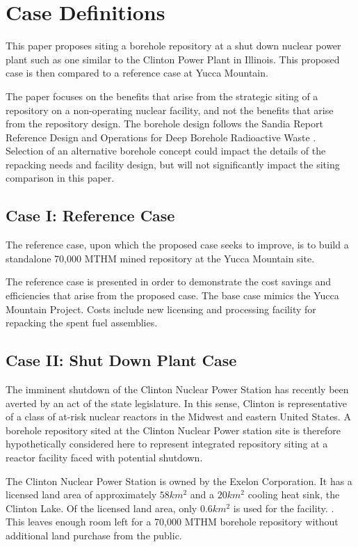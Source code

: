 
\section{Case Definitions}

This paper proposes siting a borehole
 repository at a shut down nuclear power plant such as one similar to the 
 Clinton Power Plant in Illinois. This proposed case is then compared to a 
 reference case at Yucca Mountain. 
 
The paper focuses on the benefits that arise from the strategic siting of a repository 
on a non-operating nuclear facility, and not the benefits that arise from the repository design. 
The borehole design follows the Sandia Report Reference Design and Operations 
for Deep Borehole Radioactive Waste \cite{arnold_reference_2011}. Selection of 
an alternative borehole concept could impact the details of the repacking needs 
and facility design, but will not significantly impact the siting comparison 
in this paper.
 
\subsection{Case I: Reference Case} 
The reference case, upon which the proposed case seeks to improve, is to build 
a standalone 70,000 \gls{MTHM} mined repository at the Yucca Mountain site.

The reference case is presented in order to demonstrate the cost savings and efficiencies 
that arise from the proposed case. The base case mimics the Yucca Mountain Project.
Costs include new licensing and processing facility for repacking the spent fuel assemblies.

\subsection{Case II: Shut Down Plant Case}

The imminent shutdown of the Clinton Nuclear Power Station has recently been 
averted by an act of the state legislature. In this sense, Clinton is 
representative of a class of at-risk nuclear 
reactors in the Midwest and eastern United States. A borehole repository 
sited at the Clinton Nuclear Power station site is therefore hypothetically 
considered here to represent integrated repository siting at a reactor facility 
faced with potential shutdown.

The Clinton Nuclear Power Station is owned by the Exelon Corporation. It has a 
licensed land area of approximately $58 km^2$ and a $20 km^2$ cooling heat sink, 
the Clinton Lake. Of the licensed land area, only $0.6 km^2$ is used for the facility.  
\cite{nrc_chapter_2007}.  This leaves enough room left for a 70,000 \gls{MTHM} 
borehole repository without additional land purchase from the public.



